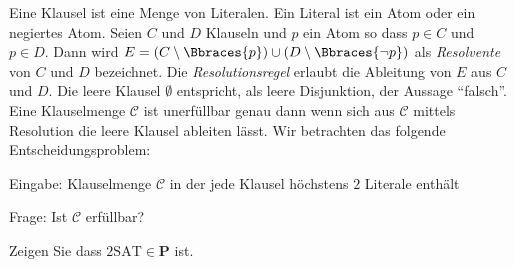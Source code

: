 
\begin{exercise}

Eine Klausel ist eine Menge von Literalen.
Ein Literal ist ein Atom oder ein negiertes Atom.
Seien $C$ und $D$ Klauseln und $p$ ein Atom so dass $p \in C$ und $p \in D$.
Dann wird $E = (C \setminus \Bbraces{p}) \cup (D \setminus \Bbraces{\neg p})$ als \textit{Resolvente} von $C$ und $D$ bezeichnet.
Die \textit{Resolutionsregel} erlaubt die Ableitung von $E$ aus $C$ und $D$.
Die leere Klausel $\emptyset$ entspricht, als leere Disjunktion, der Aussage \enquote{falsch}.
Eine Klauselmenge $\mathcal C$ ist unerfüllbar genau dann wenn sich aus $\mathcal C$ mittels Resolution die leere Klausel ableiten lässt.
Wir betrachten das folgende Entscheidungsproblem:

\begin{center}
    \begin{hetzlbox}[title = 2SAT]
        
        Eingabe:
        Klauselmenge $\mathcal C$ in der jede Klausel höchstens $2$ Literale enthält
    
        Frage:
        Ist $\mathcal C$ erfüllbar?
    
    \end{hetzlbox}   
\end{center}

Zeigen Sie dass $\mathrm{2SAT} \in \mathbf P$ ist.

\end{exercise}



